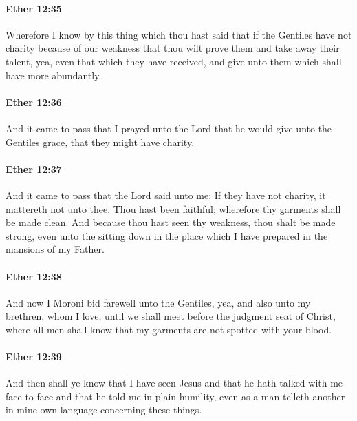		\paragraph{Ether 12:35} %
			\label{ETHER-12-35}

			Wherefore I know by this thing which thou hast said
			that if the Gentiles have not charity because of our weakness
			that thou wilt prove them and take away their talent,
			yea, even that which they have received,
			and give unto them which shall have more abundantly.

		\paragraph{Ether 12:36} %
			\label{ETHER-12-36}

			And it came to pass that I prayed unto the Lord
			that he would give unto the Gentiles grace,
			that they might have charity.

		\paragraph{Ether 12:37} %
			\label{ETHER-12-37}

			And it came to pass that the Lord said unto me:
			If they have not charity, it mattereth not unto thee.
			Thou hast been faithful;
			wherefore thy garments shall be made clean.
			And because thou hast seen thy weakness,
			thou shalt be made strong,
			even unto the sitting down in the place
			which I have prepared in the mansions of my Father.

		\paragraph{Ether 12:38} %
			\label{ETHER-12-38}

			And now I Moroni bid farewell unto the Gentiles,
			yea, and also unto my brethren, whom I love,
			until we shall meet before the judgment seat of Christ,
			where all men shall know that my garments are not spotted with your blood.

		\paragraph{Ether 12:39} %
			\label{ETHER-12-39}

			And then shall ye know that I have seen Jesus
			and that he hath talked with me face to face
			and that he told me in plain humility,
			even as a man telleth another
			in mine own language concerning these things.

